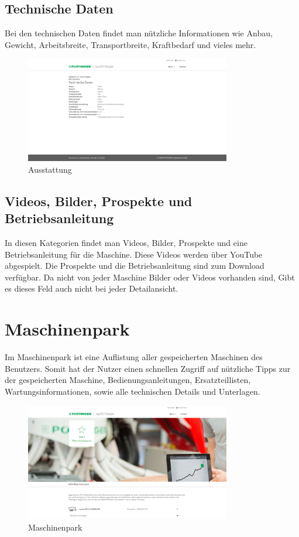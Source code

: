 \subsection{Technische Daten}

Bei den technischen Daten findet man nützliche Informationen wie Anbau, Gewicht, Arbeitsbreite, Transportbreite, Kraftbedarf und vieles mehr.

\begin{figure}[H]
	\centerline{
		\includegraphics[width=0.8\textwidth]{./grafiken/erm_detailansicht_technisch.PNG}
	}
	\vskip0pt
	\caption{Ausstattung} \label{fig:ausstattung}
\end{figure}
\subsection{Videos, Bilder, Prospekte und Betriebsanleitung}
In diesen Kategorien findet man Videos, Bilder, Prospekte und eine Betriebsanleitung für die Maschine. Diese Videos werden über YouTube abgespielt. Die Prospekte und die Betriebsanleitung sind zum Download verfügbar. Da nicht von jeder Maschine Bilder oder Videos vorhanden sind, Gibt es dieses Feld auch nicht bei jeder Detailansicht.
\section{Maschinenpark}

Im Maschinenpark ist eine Auflistung aller gespeicherten Maschinen des Benutzers. Somit hat der Nutzer einen schnellen Zugriff auf nützliche Tipps zur der gespeicherten Maschine, Bedienungsanleitungen, Ersatzteillisten, Wartungsinformationen, sowie alle technischen Details und Unterlagen.

\begin{figure}[H]
	\centerline{
		\includegraphics[width=0.8\textwidth]{./grafiken/erm_maschinenpark.png}
	}
	\vskip0pt
	\caption{Maschinenpark} \label{fig:maschinenpark}
\end{figure}

